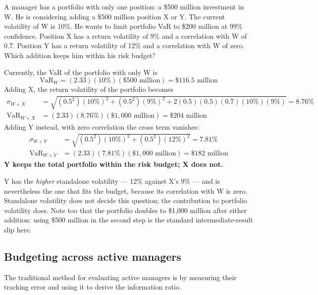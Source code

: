 \begin{imexbox}[title={Which addition keeps the manager inside the budget?}]
A manager has a portfolio with only one position: a \$500 million investment in
W. He is considering adding a \$500 million position X or Y. The current
volatility of W is 10\%. He wants to limit portfolio VaR to \$200 million at 99\%
confidence. Position X has a return volatility of 9\% and a correlation with W of
0.7. Position Y has a return volatility of 12\% and a correlation with W of zero.
Which addition keeps him within his risk budget?

\medskip
Currently, the VaR of the portfolio with only W is
\[ \text{VaR}_W = (2.33)(10\%)(\$500\text{ million}) = \$116.5\text{ million} \]
Adding X, the return volatility of the portfolio becomes
\begin{align*}
\sigma_{W+X} &= \sqrt{(0.5^2)(10\%)^2 + (0.5^2)(9\%)^2 + 2(0.5)(0.5)(0.7)(10\%)(9\%)} = 8.76\% \\
\text{VaR}_{W+X} &= (2.33)(8.76\%)(\$1{,}000\text{ million}) = \$204\text{ million}
\end{align*}
Adding Y instead, with zero correlation the cross term vanishes:
\begin{align*}
\sigma_{W+Y} &= \sqrt{(0.5^2)(10\%)^2 + (0.5^2)(12\%)^2} = 7.81\% \\
\text{VaR}_{W+Y} &= (2.33)(7.81\%)(\$1{,}000\text{ million}) = \$182\text{ million}
\end{align*}
\textbf{Y keeps the total portfolio within the risk budget; X does not.}
\end{imexbox}

\begin{imtrapbox}[breakable=false,title={The riskier asset is the safer addition}]
Y has the \emph{higher} standalone volatility --- 12\% against X's 9\% --- and is
nevertheless the one that fits the budget, because its correlation with W is
zero. Standalone volatility does not decide this question; the contribution to
portfolio volatility does. Note too that the portfolio doubles to \$1,000 million
after either addition: using \$500 million in the second step is the standard
intermediate-result slip here.
\end{imtrapbox}

\subsection{Budgeting across active managers}

The traditional method for evaluating active managers is by measuring their
tracking error and using it to derive the information ratio.

